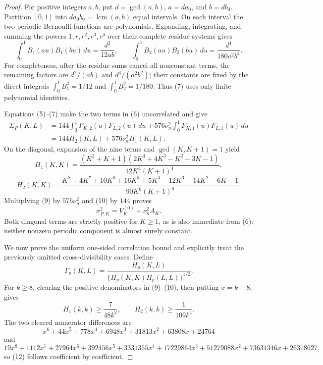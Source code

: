 \documentclass{article}
\begin{document}
\begin{proof}
For positive integers \(a,b\), put \(d=\gcd(a,b)\), \(a=da_0\), and \(b=db_0\).  Partition \([0,1]\) into \(da_0b_0=\operatorname{lcm}(a,b)\) equal intervals.  On each interval the two periodic Bernoulli functions are polynomials.  Expanding, integrating, and summing the powers \(1,r,r^2,r^3,r^4\) over their complete residue systems gives
\[
 \int_0^1B_1(au)B_1(bu)\,du=\frac{d^2}{12ab},
 \qquad
 \int_0^1B_2(au)B_2(bu)\,du=\frac{d^4}{180a^2b^2}.                             \tag{7}
\]
For completeness, after the residue sums cancel all nonconstant terms, the remaining factors are \(d^2/(ab)\) and \(d^4/(a^2b^2)\); their constants are fixed by the direct integrals \(\int_0^1B_1^2=1/12\) and \(\int_0^1B_2^2=1/180\).  Thus (7) uses only finite polynomial identities.

Equations (5)--(7) make the two terms in (6) uncorrelated and give
\[
 \begin{aligned}
 \Sigma_P(K,L)
 &=144\int_0^1F_{K,2}(u)F_{L,2}(u)\,du
 +576\nu_n^2\int_0^1F_{K,1}(u)F_{L,1}(u)\,du\\
 &=144H_2(K,L)+576\nu_n^2H_1(K,L).
 \end{aligned}                                                                    \tag{8}
\]
On the diagonal, expansion of the nine terms and \(\gcd(K,K+1)=1\) yield
\[
 H_1(K,K)=\frac{(K^2+K+1)(2K^4+4K^3-K^2-3K-1)}{12K^4(K+1)^4},                  \tag{9}
\]
\[
 H_2(K,K)=\frac{K^8+4K^7+10K^6+16K^5+5K^4-12K^3-14K^2-6K-1}
 {90K^6(K+1)^6}.                                                                 \tag{10}
\]
Multiplying (9) by \(576\nu_n^2\) and (10) by \(144\) proves
\[
 \sigma_{P,K}^2=V_K^{(0)}+\nu_n^2A_K.                                           \tag{11}
\]
Both diagonal terms are strictly positive for \(K\geq1\), as is also immediate from (6): neither nonzero periodic component is almost surely constant.

We now prove the uniform one-sided correlation bound and explicitly treat the previously omitted cross-divisibility cases.  Define
\[
 \Gamma_p(K,L)=\frac{H_p(K,L)}{\{H_p(K,K)H_p(L,L)\}^{1/2}}.
\]
For \(k\geq8\), clearing the positive denominators in (9)--(10), then putting \(x=k-8\), gives
\[
 H_1(k,k)\geq\frac7{48k^2},\qquad H_2(k,k)\geq\frac1{109k^4}.                  \tag{12}
\]
The two cleared numerator differences are
\[
 x^6+44x^5+778x^4+6948x^3+31813x^2+63808x+24764
\]
and
\[
 19x^8+1112x^7+27964x^6+392456x^5+3331355x^4+17229864x^3
 +51279088x^2+73631346x+26318627,
\]
so (12) follows coefficient by coefficient.


\end{proof}
\end{document}
